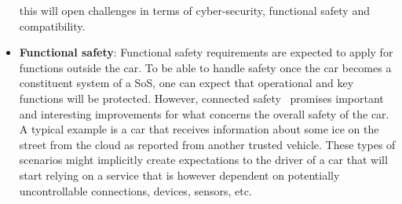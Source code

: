 \begin{itemize}
this will open challenges in terms of cyber-security, functional safety and compatibility. 
\item {\bf Functional safety}: Functional safety requirements are expected to apply for functions outside the car. To be able to handle safety once the car becomes a constituent system of a SoS, one can expect that operational and key functions will be protected. However, connected safety~\cite{VCC} promises important and interesting improvements for what concerns the overall safety of the car. A typical example is a car that receives information about some ice on the street from the cloud as reported from another trusted vehicle. These types of scenarios might implicitly create expectations to the driver of a car that will start relying on a service that is however dependent on potentially uncontrollable connections, devices, sensors, etc. 
\end{itemize}



%
%


